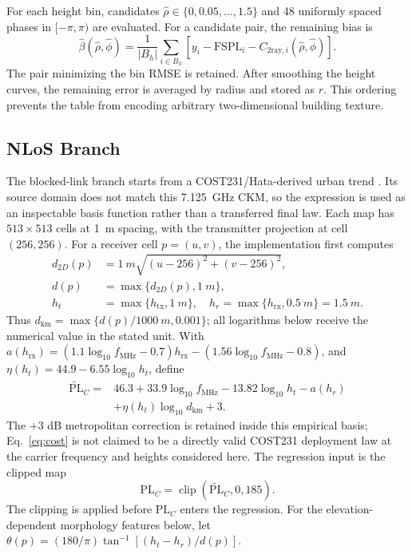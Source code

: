 \documentclass[10pt,conference]{IEEEtran}
\begin{document}
For each height bin, candidates
$\hat\rho\in\{0,0.05,\ldots,1.5\}$ and 48 uniformly spaced phases in
$[-\pi,\pi)$ are evaluated. For a candidate pair, the remaining bias is
\begin{equation}
\hat\beta(\hat\rho,\hat\phi)=\frac{1}{|B_h|}\sum_{i\in B_h}
\left[y_i-\mathrm{FSPL}_i-C_{\mathrm{2ray},i}(\hat\rho,\hat\phi)\right].
\label{eq:los-fit}
\end{equation}
The pair minimizing the bin RMSE is retained. After smoothing the height
curves, the remaining error is averaged by radius and stored as $r$. This
ordering prevents the table from encoding arbitrary two-dimensional building
texture.

\subsection{NLoS Branch}

The blocked-link branch starts from a COST231/Hata-derived urban trend
\cite{cost231}. Its source domain does not match this \SI{7.125}{GHz} CKM, so
the expression is used as an inspectable basis function rather than a
transferred final law. Each map has $513\times513$
cells at \SI{1}{m} spacing, with the transmitter projection at cell
$(256,256)$. For a receiver cell $p=(u,v)$, the implementation first computes
\begin{equation}
\begin{aligned}
d_{2D}(p)&=\SI{1}{m}\sqrt{(u-256)^2+(v-256)^2},\\
d(p)&=\max\{d_{2D}(p),\SI{1}{m}\},\\
h_t&=\max\{h_{\mathrm{tx}},\SI{1}{m}\},\quad
h_r=\max\{h_{\mathrm{rx}},\SI{0.5}{m}\}=\SI{1.5}{m}.
\end{aligned}
\label{eq:nlos-geometry}
\end{equation}
Thus $d_{\mathrm{km}}=\max\{d(p)/\SI{1000}{m},0.001\}$; all logarithms
below receive the numerical value in the stated unit. With
$a(h_{\mathrm{rx}})=(1.1\log_{10}f_{\mathrm{MHz}}-0.7)h_{\mathrm{rx}}
-(1.56\log_{10}f_{\mathrm{MHz}}-0.8)$, and
$\eta(h_t)=44.9-6.55\log_{10}h_t$, define
\begin{equation}
\begin{aligned}
\widetilde{\mathrm{PL}}_{C}={}&46.3+33.9\log_{10}f_{\mathrm{MHz}}
-13.82\log_{10}h_t-a(h_r)\\
&+\eta(h_t)\log_{10}d_{\mathrm{km}}+3.
\end{aligned}
\label{eq:cost}
\end{equation}
The $+3$ dB metropolitan correction is retained inside this empirical basis;
Eq.~\eqref{eq:cost} is not claimed to be a directly valid COST231 deployment
law at the carrier frequency and heights considered here. The regression input
is the clipped map
\begin{equation}
\mathrm{PL}_{C}=\operatorname{clip}
\!\left(\widetilde{\mathrm{PL}}_{C},0,185\right).
\label{eq:raw-nlos}
\end{equation}
The clipping is applied before $\mathrm{PL}_{C}$ enters the regression. For the
elevation-dependent morphology features below, let
$\theta(p)=(180/\pi)\tan^{-1}[(h_t-h_r)/d(p)]$.
\end{document}
